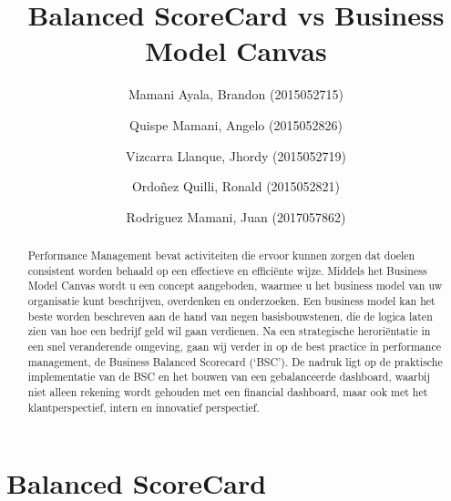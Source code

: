 \documentclass[preprint,12pt]{elsarticle}
\begin{document}
	
	\begin{frontmatter}
		
		
		\title{\huge Balanced ScoreCard vs Business Model Canvas}
		
		\author{Mamani Ayala, Brandon        (2015052715)}
		\author{Quispe Mamani, Angelo	      (2015052826)}
		\author{Vizcarra Llanque, Jhordy	      (2015052719)}
		\author{Ordoñez Quilli, Ronald          (2015052821)}
		\author{Rodriguez Mamani, Juan      (2017057862)}
		
		\address{Tacna, Perú}
		
		\begin{abstract}
			Performance Management bevat activiteiten die ervoor kunnen zorgen dat doelen consistent worden behaald op een effectieve en efficiënte wijze. Middels het Business Model Canvas wordt u een concept aangeboden, waarmee u het business model van uw organisatie kunt beschrijven, overdenken en onderzoeken. Een business model kan het beste worden beschreven aan de hand van negen basisbouwstenen, die de logica laten zien van hoe een bedrijf geld wil gaan verdienen.
Na een strategische heroriëntatie in een snel veranderende omgeving, gaan wij verder in op de best practice in performance management, de Business Balanced Scorecard (‘BSC’). De nadruk ligt op de praktische implementatie van de BSC en het bouwen van een gebalanceerde dashboard, waarbij niet alleen rekening wordt gehouden met een financial dashboard, maar ook met het klantperspectief, intern en innovatief perspectief.
	
		\end{abstract}
\end{frontmatter}

	
	
	
	



\section{Balanced ScoreCard }
\end{document}
